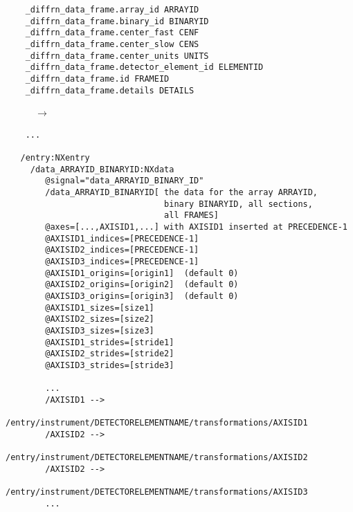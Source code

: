 \documentclass[11pt]{article}
\begin{document}
{\begin{verbatim}
    _diffrn_data_frame.array_id ARRAYID
    _diffrn_data_frame.binary_id BINARYID
    _diffrn_data_frame.center_fast CENF
    _diffrn_data_frame.center_slow CENS
    _diffrn_data_frame.center_units UNITS
    _diffrn_data_frame.detector_element_id ELEMENTID
    _diffrn_data_frame.id FRAMEID
    _diffrn_data_frame.details DETAILS
\end{verbatim}
~~~~~~$\rightarrow$\\
\begin{verbatim}
    ...

   /entry:NXentry
     /data_ARRAYID_BINARYID:NXdata
        @signal="data_ARRAYID_BINARY_ID"
        /data_ARRAYID_BINARYID[ the data for the array ARRAYID,
                                binary BINARYID, all sections,
                                all FRAMES]
        @axes=[...,AXISID1,...] with AXISID1 inserted at PRECEDENCE-1
        @AXISID1_indices=[PRECEDENCE-1]
        @AXISID2_indices=[PRECEDENCE-1]
        @AXISID3_indices=[PRECEDENCE-1]
        @AXISID1_origins=[origin1]  (default 0)
        @AXISID2_origins=[origin2]  (default 0)
        @AXISID3_origins=[origin3]  (default 0)
        @AXISID1_sizes=[size1]
        @AXISID2_sizes=[size2]
        @AXISID3_sizes=[size3]
        @AXISID1_strides=[stride1]
        @AXISID2_strides=[stride2]
        @AXISID3_strides=[stride3]

        ...
        /AXISID1 -->
            /entry/instrument/DETECTORELEMENTNAME/transformations/AXISID1
        /AXISID2 -->
            /entry/instrument/DETECTORELEMENTNAME/transformations/AXISID2
        /AXISID2 -->
            /entry/instrument/DETECTORELEMENTNAME/transformations/AXISID3
        ...


\end{verbatim}}
\end{document}
